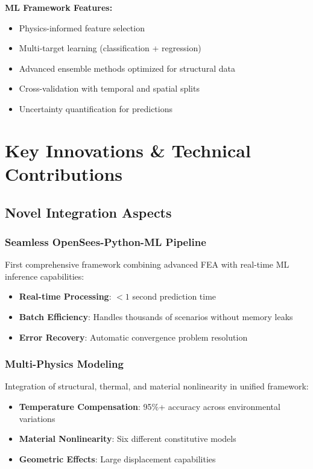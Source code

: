 \documentclass[12pt,a4paper]{article}
\begin{document}
\textbf{ML Framework Features:}
\begin{itemize}
    \item Physics-informed feature selection
    \item Multi-target learning (classification + regression)
    \item Advanced ensemble methods optimized for structural data
    \item Cross-validation with temporal and spatial splits
    \item Uncertainty quantification for predictions
\end{itemize}

\section{Key Innovations \& Technical Contributions}

\subsection{Novel Integration Aspects}

\subsubsection{Seamless OpenSees-Python-ML Pipeline}

First comprehensive framework combining advanced FEA with real-time ML inference capabilities:
\begin{itemize}
    \item \textbf{Real-time Processing}: $<1$ second prediction time
    \item \textbf{Batch Efficiency}: Handles thousands of scenarios without memory leaks
    \item \textbf{Error Recovery}: Automatic convergence problem resolution
\end{itemize}

\subsubsection{Multi-Physics Modeling}

Integration of structural, thermal, and material nonlinearity in unified framework:
\begin{itemize}
    \item \textbf{Temperature Compensation}: 95\%+ accuracy across environmental variations
    \item \textbf{Material Nonlinearity}: Six different constitutive models
    \item \textbf{Geometric Effects}: Large displacement capabilities
\end{itemize}
\end{document}
